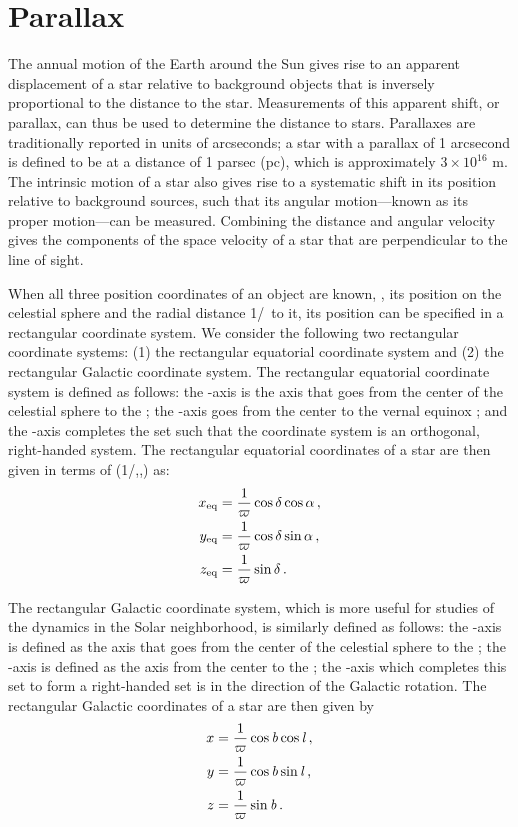 \section{Parallax}

The annual motion of the Earth around the Sun gives rise to an
apparent displacement of a star relative to background objects that is
inversely proportional to the distance to the star. Measurements of
this apparent shift, or parallax, can thus be used to determine the
distance to stars. Parallaxes are traditionally reported in units of
arcseconds; a star with a parallax of 1 arcsecond is defined to be at
a distance of 1 parsec (pc), which is approximately $3\times 10^{16}$
m. The intrinsic motion of a star also gives rise to a systematic
shift in its position relative to background sources, such that its
angular motion---known as its proper motion---can be
measured. Combining the distance and angular velocity gives the
components of the space velocity of a star that are perpendicular to
the line of sight.

When all three position coordinates of an object are known, \ie, its
position on the celestial sphere and the radial distance
1/\parallax\ to it, its position can be specified in a rectangular
coordinate system. We consider the following two rectangular
coordinate systems: (1) the rectangular equatorial coordinate system
and (2) the rectangular Galactic coordinate system. The rectangular
equatorial coordinate system is defined as follows: the \eqz-axis is
the axis that goes from the center of the celestial sphere to the
\ncp; the \eqx-axis goes from the center to the vernal equinox
\vernal; and the \eqy-axis completes the set such that the coordinate
system is an orthogonal, right-handed system. The rectangular
equatorial coordinates of a star are then given in terms of
(1/\parallax,\ra,\dec) as:
\begin{align}\label{eq:receq}
x_{\textnormal{eq}} &= \frac{1}{\varpi} \cos \delta \cos \alpha\, ,\\
y_{\textnormal{eq}} &= \frac{1}{\varpi} \cos \delta \sin \alpha\, ,\\
z_{\textnormal{eq}} &= \frac{1}{\varpi} \sin \delta\, .
\end{align}

The rectangular Galactic coordinate system, which is more useful for
studies of the dynamics in the Solar neighborhood, is similarly
defined as follows: the \galz-axis is defined as the axis that goes
from the center of the celestial sphere to the \ngp; the \galx-axis is
defined as the axis from the center to the \gc; the \galy-axis which
completes this set to form a right-handed set is in the direction of
the Galactic rotation. The rectangular Galactic coordinates of a star
are then given by
\begin{align}\label{eq:recgal}
x &= \frac{1}{\varpi} \cos {\it b} \cos {\it l}\, ,\\
y &= \frac{1}{\varpi} \cos {\it b} \sin {\it l}\, ,\\
z &= \frac{1}{\varpi} \sin {\it b}\, .
\end{align}


